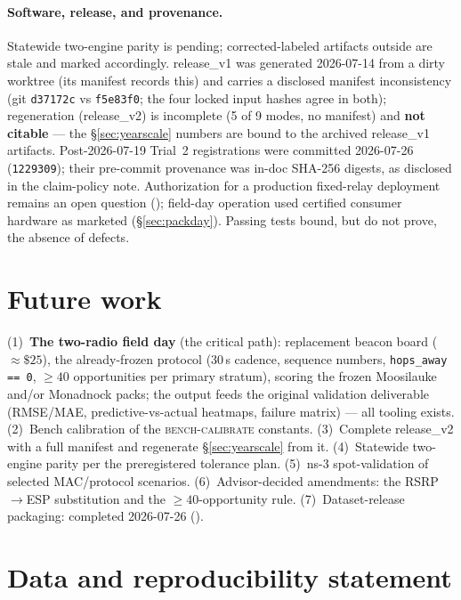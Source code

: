 \documentclass[11pt]{article}
\newcommand{\code}[1]{\texttt{\small #1}}
\begin{document}
\paragraph{Software, release, and provenance.} Statewide two-engine parity is
pending; corrected-labeled artifacts outside  are stale and
marked accordingly. release\_v1 was generated 2026-07-14 from a dirty
worktree (its manifest records this) and carries a disclosed manifest
inconsistency (git \code{d37172c} vs \code{f5e83f0}; the four locked input
hashes agree in both); regeneration (release\_v2) is incomplete (5 of 9
modes, no manifest) and \textbf{not citable} --- the \S\ref{sec:yearscale}
numbers are bound to the archived release\_v1 artifacts. Post-2026-07-19 Trial~2 registrations were committed 2026-07-26 (\code{1229309}); their pre-commit provenance was in-doc SHA-256 digests, as disclosed in the claim-policy note. Authorization for a production fixed-relay deployment
remains an open question ();
field-day operation used certified consumer hardware as marketed
(\S\ref{sec:packday}). Passing tests bound, but do not prove, the absence of
defects.

\section{Future work}\label{sec:future}

(1)~\textbf{The two-radio field day} (the critical path): replacement beacon
board (${\approx}\$25$), the already-frozen protocol (30\,s cadence, sequence
numbers, \code{hops\_away == 0}, ${\geq}40$ opportunities per primary
stratum), scoring the frozen Moosilauke and/or Monadnock packs; the output
feeds the original validation deliverable (RMSE/MAE, predictive-vs-actual
heatmaps, failure matrix) --- all tooling exists. (2)~Bench calibration of
the \textsc{bench-calibrate} constants. (3)~Complete release\_v2 with a full
manifest and regenerate \S\ref{sec:yearscale} from it. (4)~Statewide
two-engine parity per the preregistered tolerance plan. (5)~ns-3
spot-validation of selected MAC/protocol scenarios. (6)~Advisor-decided
amendments: the RSRP$\to$ESP substitution and the ${\geq}40$-opportunity
rule. (7)~Dataset-release packaging: completed 2026-07-26 ().

\section{Data and reproducibility statement}\label{sec:repro}
\end{document}
